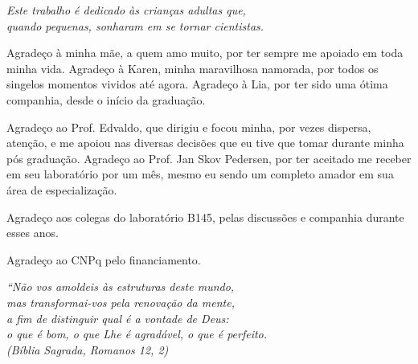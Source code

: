 \documentclass[
	12pt,				%
	openright,			%
	twoside,			%
	a4paper,			%
	english,			%
	brazil%
	]{abntex2}
\begin{document}
\begin{dedicatoria}
   \vspace*{\fill}
   \centering
   \noindent
   \textit{ Este trabalho é dedicado às crianças adultas que,\\
   quando pequenas, sonharam em se tornar cientistas.} \vspace*{\fill}
\end{dedicatoria}

\begin{agradecimentos}

Agradeço à minha mãe, a quem amo muito, por ter sempre me apoiado em toda minha vida. Agradeço à Karen, minha maravilhosa namorada, por todos os singelos momentos vividos até agora. Agradeço à Lia, por ter sido uma ótima companhia, desde o início da graduação.

Agradeço ao Prof. Edvaldo, que dirigiu e focou minha, por vezes dispersa, atenção, e me apoiou nas diversas decisões que eu tive que tomar durante minha pós graduação. Agradeço ao Prof. Jan Skov Pedersen, por ter aceitado me receber em seu laboratório por um mês, mesmo eu sendo um completo amador em sua área de especialização.

Agradeço aos colegas do laboratório B145, pelas discussões e companhia durante esses anos.

Agradeço ao CNPq pelo financiamento.

\end{agradecimentos}

\begin{epigrafe}
    \vspace*{\fill}
	\begin{flushright}
		\textit{``Não vos amoldeis às estruturas deste mundo, \\
		mas transformai-vos pela renovação da mente, \\
		a fim de distinguir qual é a vontade de Deus: \\
		o que é bom, o que Lhe é agradável, o que é perfeito.\\
		(Bíblia Sagrada, Romanos 12, 2)}
	\end{flushright}
\end{epigrafe}

\end{document}
